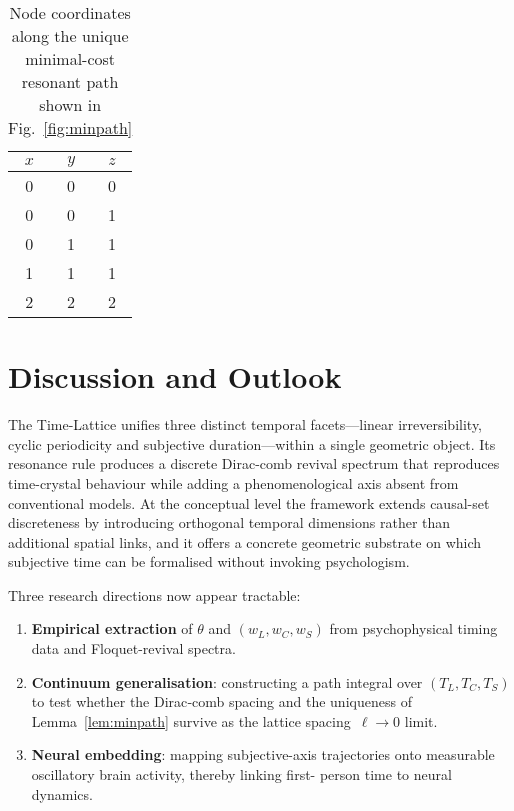 \documentclass[11pt]{article}
\begin{document}
\begin{table}[h]
  \centering
  \begin{tabular}{ccc}
    \hline
    $x$ & $y$ & $z$ \\
    \hline
    0 & 0 & 0 \\
    0 & 0 & 1 \\
    0 & 1 & 1 \\
    1 & 1 & 1 \\
    2 & 2 & 2 \\
    \hline
  \end{tabular}
  \caption{Node coordinates along the unique minimal-cost resonant path shown in Fig.~\ref{fig:minpath}}
  \label{tab:path}
\end{table}

\section{Discussion and Outlook}\label{sec:discussion}

The Time-Lattice unifies three distinct temporal facets—linear
irreversibility, cyclic periodicity and subjective duration—within a
single geometric object.  Its resonance rule produces a discrete
Dirac-comb revival spectrum that reproduces time-crystal behaviour while
adding a phenomenological axis absent from conventional models.  At the
conceptual level the framework extends causal-set discreteness by
introducing orthogonal temporal dimensions rather than additional spatial
links, and it offers a concrete geometric substrate on which subjective
time can be formalised without invoking psychologism.

Three research directions now appear tractable:

\begin{enumerate}
\begingroup\sloppy
\item \textbf{Empirical extraction} of $\theta$ and $(w_L,w_C,w_S)$ from
      psychophysical timing data and Floquet-revival spectra.
\item \textbf{Continuum generalisation}: constructing a path integral
      over $(T_L,\allowbreak T_C,\allowbreak T_S)$ to test whether the
      Dirac\hspace{0pt}‐\hspace{0pt}comb spacing and the uniqueness of
      Lemma~\ref{lem:minpath} survive as the lattice
      spacing~$\ell\hspace{0pt}\to\hspace{0pt}0$ limit.
      
\endgroup
\item \textbf{Neural embedding}: mapping subjective-axis trajectories
      onto measurable oscillatory brain activity, thereby linking first-
      person time to neural dynamics.
\end{enumerate}
\end{document}
